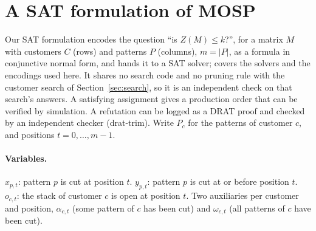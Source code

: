 \section{A SAT formulation of MOSP}
\label{app:sat}

Our SAT formulation encodes the question ``is $Z(M)\le k$?'', for a matrix $M$
with customers $C$ (rows) and patterns $P$ (columns), $m=|P|$, as a formula
in conjunctive normal form, and hands it to a SAT solver; \citet{Knuth2015}
covers the solvers and the encodings used here. It shares no search code and no pruning rule with the customer search of Section~\ref{sec:search}, so it is
an independent check on that search's answers. A satisfying assignment gives a
production order that can be verified by simulation. A refutation can be
logged as a DRAT proof and checked by an independent checker (drat-trim).
Write $P_c$ for the patterns of customer $c$, and positions
$t=0,\dots,m-1$.

\paragraph{Variables.} $x_{p,t}$: pattern $p$ is cut at position $t$.
$y_{p,t}$: pattern $p$ is cut at or before position $t$. $o_{c,t}$: the stack of
customer $c$ is open at position $t$. Two auxiliaries per customer and
position, $\alpha_{c,t}$ (some pattern of $c$ has been cut) and
$\omega_{c,t}$ (all patterns of $c$ have been cut).

